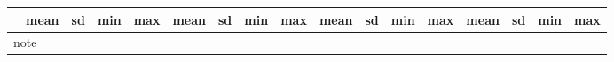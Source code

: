 \begin{tabular}{l*{4}{cccc}}
\toprule
            &        mean&          sd&         min&         max&        mean&          sd&         min&         max&        mean&          sd&         min&         max&        mean&          sd&         min&         max\\
\midrule
\bottomrule
\multicolumn{17}{l}{\footnotesize note}\\
\end{tabular}
